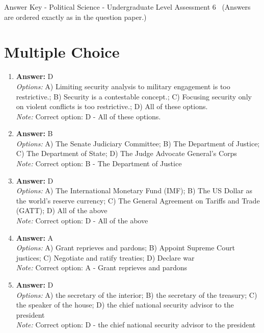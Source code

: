 \documentclass[12pt]{article}
\begin{document}
\begin{center}
Answer Key - Political Science - Undergraduate Level Assessment 6 \
\small (Answers are ordered exactly as in the question paper.)
\end{center}

\section*{Multiple Choice}
\begin{enumerate}[label=\arabic*.]
\item \textbf{Answer:} D
\\ \textit{Options:} A) Limiting security analysis to military engagement is too restrictive.; B) Security is a contestable concept.; C) Focusing security only on violent conflicts is too restrictive.; D) All of these options.
\\ \textit{Note:} Correct option: D - All of these options.
\item \textbf{Answer:} B
\\ \textit{Options:} A) The Senate Judiciary Committee; B) The Department of Justice; C) The Department of State; D) The Judge Advocate General's Corps
\\ \textit{Note:} Correct option: B - The Department of Justice
\item \textbf{Answer:} D
\\ \textit{Options:} A) The International Monetary Fund (IMF); B) The US Dollar as the world's reserve currency; C) The General Agreement on Tariffs and Trade (GATT); D) All of the above
\\ \textit{Note:} Correct option: D - All of the above
\item \textbf{Answer:} A
\\ \textit{Options:} A) Grant reprieves and pardons; B) Appoint Supreme Court justices; C) Negotiate and ratify treaties; D) Declare war
\\ \textit{Note:} Correct option: A - Grant reprieves and pardons
\item \textbf{Answer:} D
\\ \textit{Options:} A) the secretary of the interior; B) the secretary of the treasury; C) the speaker of the house; D) the chief national security advisor to the president
\\ \textit{Note:} Correct option: D - the chief national security advisor to the president
\end{enumerate}
\end{document}
